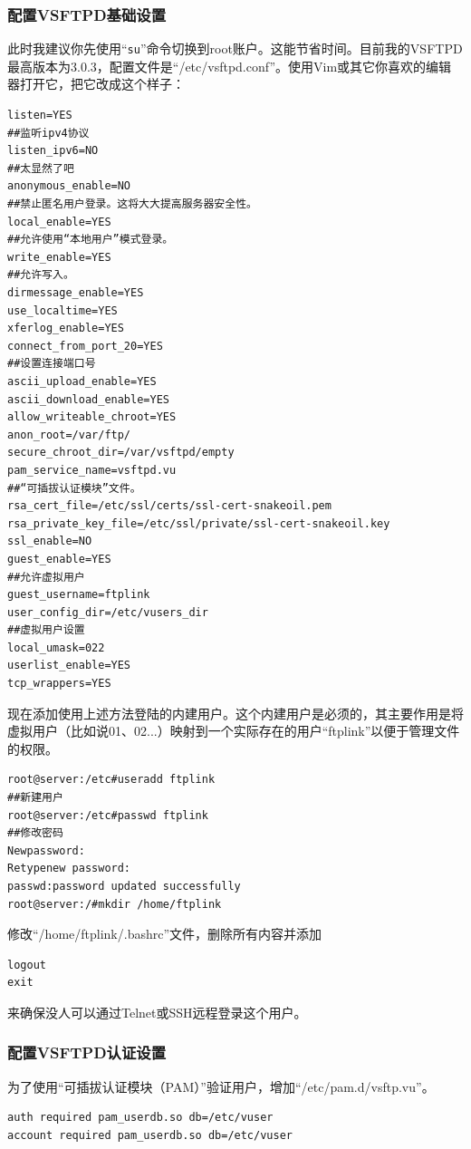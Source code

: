 \subsubsection{配置VSFTPD基础设置}
此时我建议你先使用“\verb|su|”命令切换到root账户。这能节省时间。目前我的VSFTPD最高版本为3.0.3，配置文件是“/etc/vsftpd.conf”。使用Vim或其它你喜欢的编辑器打开它，把它改成这个样子：
\begin{verbatim}
listen=YES
##监听ipv4协议
listen_ipv6=NO
##太显然了吧
anonymous_enable=NO
##禁止匿名用户登录。这将大大提高服务器安全性。
local_enable=YES
##允许使用“本地用户”模式登录。
write_enable=YES
##允许写入。
dirmessage_enable=YES
use_localtime=YES
xferlog_enable=YES
connect_from_port_20=YES
##设置连接端口号
ascii_upload_enable=YES
ascii_download_enable=YES
allow_writeable_chroot=YES
anon_root=/var/ftp/
secure_chroot_dir=/var/vsftpd/empty
pam_service_name=vsftpd.vu
##“可插拔认证模块”文件。
rsa_cert_file=/etc/ssl/certs/ssl-cert-snakeoil.pem
rsa_private_key_file=/etc/ssl/private/ssl-cert-snakeoil.key
ssl_enable=NO
guest_enable=YES
##允许虚拟用户
guest_username=ftplink
user_config_dir=/etc/vusers_dir
##虚拟用户设置
local_umask=022
userlist_enable=YES
tcp_wrappers=YES
\end{verbatim}
现在添加使用上述方法登陆的内建用户。这个内建用户是必须的，其主要作用是将虚拟用户（比如说01、02...）映射到一个实际存在的用户“ftplink”以便于管理文件的权限。
\begin{verbatim}
root@server:/etc#useradd ftplink
##新建用户
root@server:/etc#passwd ftplink
##修改密码
Newpassword:
Retypenew password:
passwd:password updated successfully
root@server:/#mkdir /home/ftplink
\end{verbatim}\par
修改“/home/ftplink/.bashrc”文件，删除所有内容并添加
\begin{verbatim}
logout
exit
\end{verbatim}\par
来确保没人可以通过Telnet或SSH远程登录这个用户。
\subsubsection{配置VSFTPD认证设置}
为了使用“可插拔认证模块（PAM）”验证用户，增加“/etc/pam.d/vsftp.vu”。
\begin{verbatim}
auth required pam_userdb.so db=/etc/vuser
account required pam_userdb.so db=/etc/vuser
\end{verbatim}
